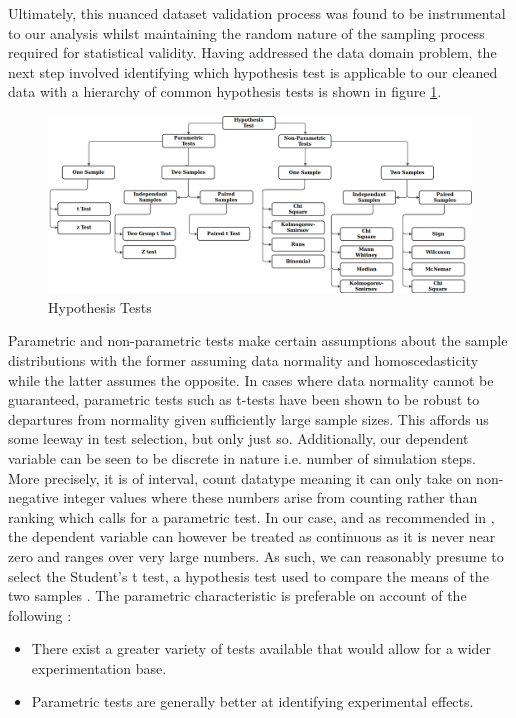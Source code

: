 \documentclass{report}
\begin{document}
Ultimately, this nuanced dataset validation process was found to be instrumental to our analysis whilst maintaining the random nature of the sampling process required for statistical validity. Having addressed the data domain problem, the next step involved identifying which hypothesis test is applicable to our cleaned data with a hierarchy of common hypothesis tests is shown in figure \ref{fig:hyp_tests}.

\begin{figure}[h]
	\centering
	\includegraphics[width=\textwidth]{images/HypothesisTest}
	\caption{Hypothesis Tests}
	\label{fig:hyp_tests}
\end{figure}

Parametric and non-parametric tests make certain assumptions about the sample distributions with the former assuming data normality and homoscedasticity while the latter assumes the opposite. In cases where data normality cannot be guaranteed, parametric tests such as t-tests have been shown to be robust to departures from normality given sufficiently large sample sizes. This affords us some leeway in test selection, but only just so. Additionally, our dependent variable can be seen to be discrete in nature i.e. number of simulation steps. More precisely, it is of interval, count datatype meaning it can only take on non-negative integer values where these numbers arise from counting rather than ranking which calls for a parametric test. In our case, and as recommended in \cite{CountCont}, the dependent variable can however be treated as continuous as it is never near zero and ranges over very large numbers. As such, we can reasonably presume to select the Student's t test, a hypothesis test used to compare the means of the two samples \cite{Donald2008}. The parametric characteristic is preferable on account of the following \cite{Field2012}:
\begin{itemize}
	\item There exist a greater variety of tests available that would allow for a wider experimentation base.
	\item Parametric tests are generally better at identifying experimental effects.
\end{itemize}
\end{document}
